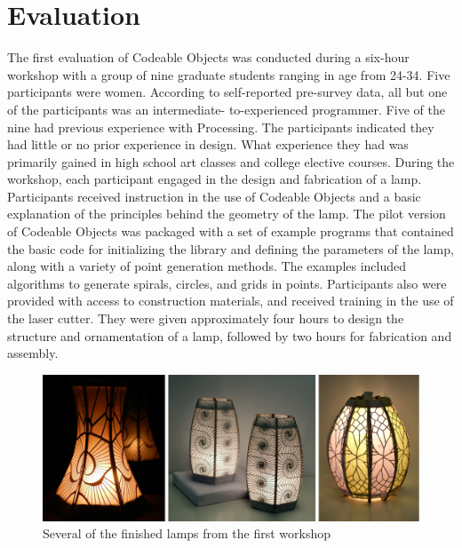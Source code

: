 \section{Evaluation}
The first evaluation of Codeable Objects was conducted  during a six-hour workshop with a group of nine graduate students ranging in age from 24-34. Five participants were women. According to self-reported pre-survey data, all but one of the participants was an intermediate- to-experienced programmer. Five of the nine had previous experience with Processing. The participants indicated they had little or no prior experience in design. What experience they had was primarily gained in high school art classes and college elective courses. During the workshop, each participant engaged in the design and fabrication of a lamp. Participants received instruction in the use of Codeable Objects and a basic explanation of the principles behind the geometry of the lamp. The pilot version of Codeable Objects was packaged with a set of example programs that contained the basic code for initializing the library and defining the parameters of the lamp, along with a variety of point generation methods. The examples included algorithms to generate spirals, circles, and grids in points. Participants also were provided with access to construction materials, and received training in the use of the laser cutter. They were given approximately four hours to design the structure and ornamentation of a lamp, followed by two hours for fabrication and assembly.

\begin{center}
\begin{figure}[h!]
\includegraphics[width=\columnwidth]{images/finished_lamps2.png}
\caption{Several of the finished lamps from the first workshop}
\label{fig:finished_lamps}
\end{figure}
\end{center}
\vspace{-20pt}

